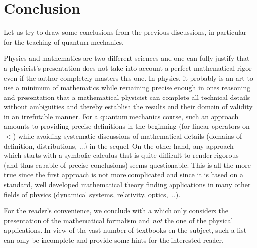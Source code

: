 \documentclass[12pt]{report}
\def\underline{\relax}
\begin{document}
 
\chapter{Conclusion}
 
Let us try to draw some conclusions from the previous discussions, 
in particular for the teaching of quantum mechanics. 

Physics and mathematics are two different sciences and one can 
fully justify that a physicist's presentation does not 
take into account a perfect mathematical rigor even if the author 
completely masters this one. In physics, 
it probably is an art to use a minimum of mathematics while 
remaining precise enough in ones reasoning and  presentation
that a mathematical physicist can complete all technical details   
 without ambiguities and thereby establish the results and 
 their domain of validity in an irrefutable manner. 
For a quantum mechanics course, 
such an approach amounts to providing 
precise definitions in the beginning (for linear operators 
on $\lt$) while avoiding systematic discussions of  
mathematical details (domains of definition, distributions, ...)
in the sequel. 
On the other hand, any approach which starts with 
a symbolic calculus that 
is quite difficult to render rigorous (and thus capable  
of precise conclusions) seems questionable. 
This is all the more true since the first approach is not more complicated 
and since it is based on a standard, well developed 
mathematical theory finding applications in many other fields 
of physics (dynamical systems, relativity, optics, ...). 

\medskip 

For the reader's convenience, we conclude with a 
{\underline{\em short guide to the literature}}
which only considers the presentation of the 
mathematical formalism and {\em not} the one of the physical 
applications. In view of the vast number of textbooks 
on the subject, such a list can only be incomplete
and provide some hints for the interested reader. 
\end{document}
